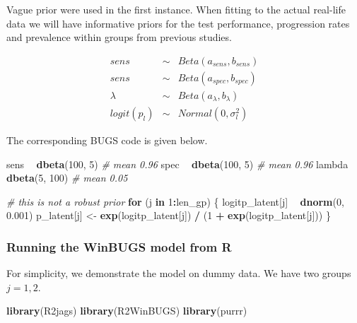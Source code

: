 \documentclass[]{article}
\newenvironment{Shaded}{\begin{snugshade}}{\end{snugshade}}
\newcommand{\CommentTok}[1]{\textcolor[rgb]{0.56,0.35,0.01}{\textit{#1}}}
\newcommand{\ControlFlowTok}[1]{\textcolor[rgb]{0.13,0.29,0.53}{\textbf{#1}}}
\newcommand{\DecValTok}[1]{\textcolor[rgb]{0.00,0.00,0.81}{#1}}
\newcommand{\FloatTok}[1]{\textcolor[rgb]{0.00,0.00,0.81}{#1}}
\newcommand{\KeywordTok}[1]{\textcolor[rgb]{0.13,0.29,0.53}{\textbf{#1}}}
\newcommand{\NormalTok}[1]{#1}
\newcommand{\OperatorTok}[1]{\textcolor[rgb]{0.81,0.36,0.00}{\textbf{#1}}}
\newcommand{\StringTok}[1]{\textcolor[rgb]{0.31,0.60,0.02}{#1}}
\begin{document}
Vague prior were used in the first instance. When fitting to the actual
real-life data we will have informative priors for the test performance,
progression rates and prevalence within groups from previous studies.

\begin{eqnarray*}
sens &\sim& Beta(a_{sens}, b_{sens})\\
sens &\sim& Beta(a_{spec}, b_{spec})\\
\lambda &\sim& Beta(a_{\lambda}, b_{\lambda})\\
logit(p_l) &\sim& Normal(0, \sigma^2_l) 
\end{eqnarray*}

The corresponding BUGS code is given below.

\begin{Shaded}
\begin{Highlighting}[]
\NormalTok{sens }\OperatorTok{~}\StringTok{ }\KeywordTok{dbeta}\NormalTok{(}\DecValTok{100}\NormalTok{, }\DecValTok{5}\NormalTok{)   }\CommentTok{# mean 0.96}
\NormalTok{spec }\OperatorTok{~}\StringTok{ }\KeywordTok{dbeta}\NormalTok{(}\DecValTok{100}\NormalTok{, }\DecValTok{5}\NormalTok{)   }\CommentTok{# mean 0.96}
\NormalTok{lambda }\OperatorTok{~}\StringTok{ }\KeywordTok{dbeta}\NormalTok{(}\DecValTok{5}\NormalTok{, }\DecValTok{100}\NormalTok{) }\CommentTok{# mean 0.05}

\CommentTok{# this is not a robust prior}
\ControlFlowTok{for}\NormalTok{ (j }\ControlFlowTok{in} \DecValTok{1}\OperatorTok{:}\NormalTok{len_gp) \{}
\NormalTok{  logitp_latent[j] }\OperatorTok{~}\StringTok{ }\KeywordTok{dnorm}\NormalTok{(}\DecValTok{0}\NormalTok{, }\FloatTok{0.001}\NormalTok{)}
\NormalTok{  p_latent[j] <-}\StringTok{ }\KeywordTok{exp}\NormalTok{(logitp_latent[j]) }\OperatorTok{/}\StringTok{ }\NormalTok{(}\DecValTok{1} \OperatorTok{+}\StringTok{ }\KeywordTok{exp}\NormalTok{(logitp_latent[j]))}
\NormalTok{\}}
\end{Highlighting}
\end{Shaded}

\hypertarget{running-the-winbugs-model-from-r}{%
\subsubsection{Running the WinBUGS model from
R}\label{running-the-winbugs-model-from-r}}

For simplicity, we demonstrate the model on dummy data. We have two
groups \(j = 1, 2\).

\begin{Shaded}
\begin{Highlighting}[]
\KeywordTok{library}\NormalTok{(R2jags)}
\KeywordTok{library}\NormalTok{(R2WinBUGS)}
\KeywordTok{library}\NormalTok{(purrr)}
\end{Highlighting}
\end{Shaded}
\end{document}
